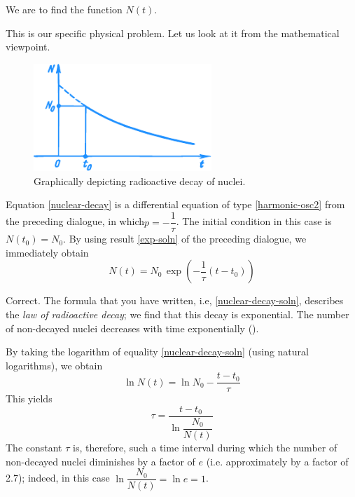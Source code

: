 We are to find the function $N (t)$.

This is our specific physical problem. Let us look at it from the mathematical viewpoint.

\begin{figure}[!ht]%
\centering
\includegraphics[width=0.6\textwidth]{figures/fig-56.pdf} 
\caption{Graphically depicting radioactive decay of nuclei.}
\label{fig-56}
\end{figure}

\rdr Equation \eqref{nuclear-decay} is a differential equation of type
\eqref{harmonic-osc2} from the preceding dialogue, in which$p = -\dfrac{1}{\tau}$. The initial condition in this case is $N (t_{0}) = N_{0}.$ By using result \eqref{exp-soln} of the preceding dialogue, we immediately obtain
\begin{equation}%
\boxed{
N (t) =N_{0} \, \exp \left( - \dfrac{1}{\tau} (t - t_{0}) \right)}
\label{nuclear-decay-soln}
\end{equation}

\athr Correct. The formula that you have written, i.e, \eqref{nuclear-decay-soln}, describes the \emph{law of radioactive decay}; we find that this decay is exponential. The number of non-decayed nuclei decreases with time exponentially ().

By taking the logarithm of equality \eqref{nuclear-decay-soln} (using natural logarithms), we obtain
\begin{equation*}%
\ln N(t) = \ln N_{0} - \dfrac{t - t_{0}}{\tau}
\end{equation*}
This yields
\begin{equation*}%
\tau = \dfrac{t - t_{0}}{\ln \dfrac{N_{0}}{N(t)}}
\end{equation*}
The constant $\tau$ is, therefore, such a time interval during which the number of non-decayed nuclei diminishes by a factor of $e$ (i.e. approximately by a factor of 2.7); indeed, in this case $\ln \dfrac{N_{0}}{N(t)} = \ln e = 1$.


